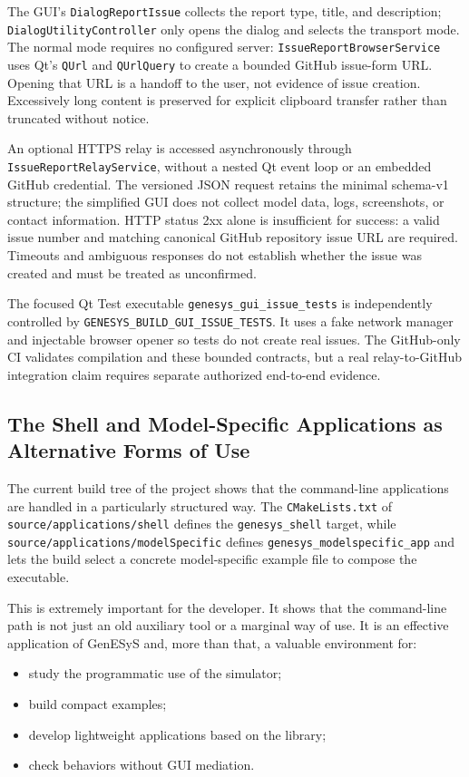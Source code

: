 The GUI's \texttt{DialogReportIssue} collects the report type, title, and
description; \texttt{DialogUtilityController} only opens the dialog and
selects the transport mode. The normal mode requires no configured server:
\texttt{IssueReportBrowserService} uses Qt's \texttt{QUrl} and
\texttt{QUrlQuery} to create a bounded GitHub issue-form URL. Opening that
URL is a handoff to the user, not evidence of issue creation. Excessively
long content is preserved for explicit clipboard transfer rather than
truncated without notice.

An optional HTTPS relay is accessed asynchronously through
\texttt{IssueReportRelayService}, without a nested Qt event loop or an
embedded GitHub credential. The versioned JSON request retains the minimal
schema-v1 structure; the simplified GUI does not collect model data, logs,
screenshots, or contact information. HTTP status 2xx alone is insufficient
for success: a valid issue number and matching canonical GitHub repository
issue URL are required. Timeouts and ambiguous responses do not establish
whether the issue was created and must be treated as unconfirmed.

The focused Qt Test executable \texttt{genesys\_gui\_issue\_tests}
is independently controlled by
\texttt{GENESYS\_BUILD\_GUI\_ISSUE\_TESTS}. It uses a fake network
manager and injectable browser opener so tests do not create real issues.
The GitHub-only CI validates compilation and these bounded contracts, but
a real relay-to-GitHub integration claim requires separate authorized
end-to-end evidence.

\subsection{The Shell and Model-Specific Applications as Alternative Forms of Use}
\label{subsec:cap10_shell_modelspecific_forma_alternativa}

The current build tree of the project shows that the command-line applications are handled in a particularly structured way. The \texttt{CMakeLists.txt} of \texttt{source/applications/shell} defines the \texttt{genesys\_shell} target, while \texttt{source/applications/modelSpecific} defines \texttt{genesys\_modelspecific\_app} and lets the build select a concrete model-specific example file to compose the executable.

This is extremely important for the developer. It shows that the command-line path is not just an old auxiliary tool or a marginal way of use. It is an effective application of GenESyS and, more than that, a valuable environment for:
\begin{itemize}
 \item study the programmatic use of the simulator;
 \item build compact examples;
 \item develop lightweight applications based on the library;
 \item check behaviors without GUI mediation.
\end{itemize}

